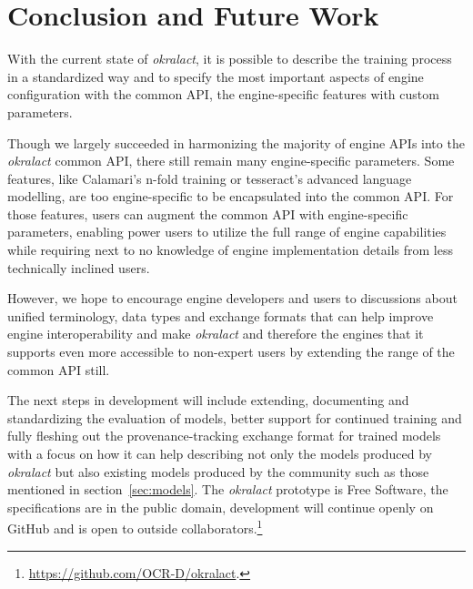 \documentclass[sigconf]{acmart}
\begin{document}
\section{Conclusion and Future Work}

With the current state of \textit{okralact}, it is possible to describe the
training process in a standardized way and to specify the most important
aspects  of engine configuration with the common API, the engine-specific
features with custom parameters.


Though we largely succeeded in harmonizing the majority of engine APIs into the
\textit{okralact} common API, there still remain many engine-specific parameters. Some
features, like Calamari's n-fold training or tesseract's advanced language
modelling, are too engine-specific to be encapsulated into the common API. 
For those features, users can augment the common API with engine-specific parameters, 
enabling power users to utilize the full range of engine capabilities while requiring 
next to no knowledge of engine implementation details from less technically inclined users.

However, we hope to encourage engine developers and
users to discussions about unified terminology, data types and exchange 
formats that can help improve engine interoperability and 
make \textit{okralact} and therefore the engines that it supports even more
accessible to non-expert users by extending the range of the common API still.

The next steps in development will include extending, documenting and standardizing
the evaluation of models, better support for continued training and fully fleshing
out the provenance-tracking exchange format for trained models with a focus on
how it can help describing not only the models produced by \textit{okralact} but
also existing models produced by the community such as those mentioned in
section~\ref{sec:models}. The \textit{okralact} prototype is Free Software, the
specifications are in the public domain, development will continue openly on
GitHub and is open to outside collaborators.\footnote{\url{https://github.com/OCR-D/okralact}.}



\end{document}
